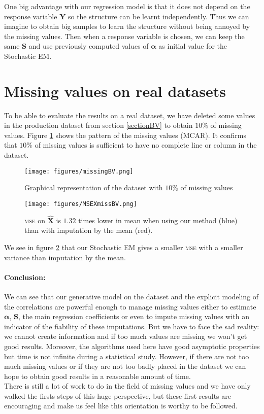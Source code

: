 \documentclass[12pt,a4paper]{report}
\begin{document}
		One big advantage with our regression model is that it does not depend on the response variable $\boldsymbol{Y}$ so the structure can be learnt independently. Thus we can imagine to obtain big samples to learn the structure without being annoyed by the missing values. Then when a response variable is chosen, we can keep the same $\boldsymbol{S}$ and use previously computed values of $\boldsymbol{\alpha}$ as initial value for the Stochastic EM. 

	\section{Missing values on real datasets}	
		To be able to evaluate the results on a real dataset, we have deleted some values in the production dataset from section \ref{sectionBV} to obtain $10\%$ of missing values. Figure \ref{missingBV} shows the pattern of the missing values (MCAR). It confirms that $10\%$ of missing values is sufficient to have no complete line or column in the dataset. 
	
	\begin{figure}[h!]
		\centering
		\texttt{[image: figures/missingBV.png]} 
		\caption{Graphical representation of the dataset with $10\%$ of missing values}\label{missingBV}
	\end{figure}
	\begin{figure}[h!]
		\centering
		\texttt{[image: figures/MSEXmissBV.png]} 
		\caption{\textsc{mse} on $\hat{\boldsymbol{X}}$ is $1.32$ times lower in mean when using our method (blue) than with imputation by the mean (red).}\label{MSEXmissBV}
	\end{figure}
	We see in figure \ref{MSEXmissBV} that our Stochastic EM gives a smaller \textsc{mse} with a smaller variance than imputation by the mean. 
	
\FloatBarrier	
\paragraph{Conclusion:}	We can see that our generative model on the dataset and the explicit modeling of the correlations are powerful enough to manage missing values either to estimate $\boldsymbol{\alpha}$, $\boldsymbol{S}$, the main regression coefficients or even to impute missing values with an indicator of the fiability of these imputations. But we have to face the sad reality: we cannot create information and if too much values are missing we won't get good results. Moreover, the algorithms used here have good asymptotic properties but time is not infinite during a statistical study. However, if there are not too much missing values or if they are not too badly placed in the dataset we can hope to obtain good results in a reasonable amount of time.\\
There is still a lot of work to do in the field of missing values and we have only walked the firsts steps of this huge perspective, but these first results are encouraging and make us feel like this orientation is worthy to be followed.
\end{document}
